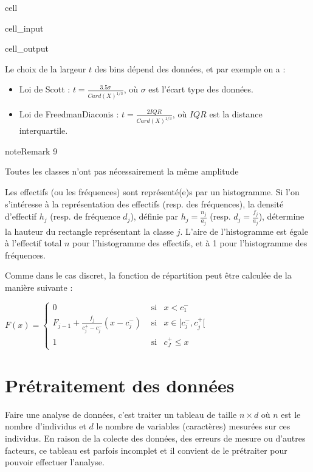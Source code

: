 \documentclass[letterpaper,10pt,french]{sphinxmanual}
\begin{document}
\begin{sphinxuseclass}{cell}
\begin{sphinxuseclass}{cell_input}
\end{sphinxuseclass}
\begin{sphinxuseclass}{cell_output}
\noindent{}

\end{sphinxuseclass}
\end{sphinxuseclass}
\sphinxAtStartPar
Le choix de la largeur \(t\) des bins dépend des données, et par exemple on a :
\begin{itemize}
\item {} 
\sphinxAtStartPar
Loi de Scott : \(t = \frac{3.5 \sigma}{Card(X)^{1/3}}\), où \(\sigma\) est l’écart type des données.

\item {} 
\sphinxAtStartPar
Loi de Freedman\textendash{}Diaconis : \( t = \frac{2 IQR}{Card(X)^{1/3}}\), où \(IQR\) est la distance interquartile.

\end{itemize}
\label{statsdescriptives:remark-3}
\begin{sphinxadmonition}{note}{Remark 9}



\sphinxAtStartPar
Toutes les classes n’ont pas nécessairement la même amplitude
\end{sphinxadmonition}

\sphinxAtStartPar
Les effectifs (ou les fréquences) sont représenté(e)s par un histogramme. Si l’on s’intéresse à la représentation des effectifs (resp. des fréquences), la densité d’effectif \(h_j\) (resp. de fréquence \(d_j\)),  définie par \(h_j=\frac{n_j}{a_j}\) (resp. \(d_j=\frac{f_j}{a_j}\)), détermine la hauteur du rectangle représentant la classe \(j\). L’aire de l’histogramme est égale à l’effectif total \(n\) pour l’histogramme des effectifs, et à 1 pour l’histogramme des fréquences.

\sphinxAtStartPar
Comme dans le cas discret, la fonction de répartition peut être calculée de la manière suivante :

\sphinxAtStartPar
\(F(x) = \left \{
\begin{eqnarray}
0&\textrm{ si}& x<c^-_1\\
F_{j-1}+\frac{f_j}{c^+_j-c^-_j}(x-c^-_j) &\textrm{ si}& x\in[c^-_j,c^+_j[\\
1& \textrm{ si}&c^+_J\leq x
\end{eqnarray}\right .\)


\section{Pré\sphinxhyphen{}traitement des données}
\label{\detokenize{statsdescriptives:pre-traitement-des-donnees}}
\sphinxAtStartPar
Faire une analyse de données, c’est traiter un tableau de taille \(n\times d\) où \(n\) est le nombre d’individus et \(d\) le nombre de variables (caractères) mesurées sur ces individus. En raison de la colecte des données, des erreurs de mesure ou d’autres facteurs, ce tableau est parfois incomplet et il convient de le prétraiter pour pouvoir effectuer l’analyse.
\end{document}
